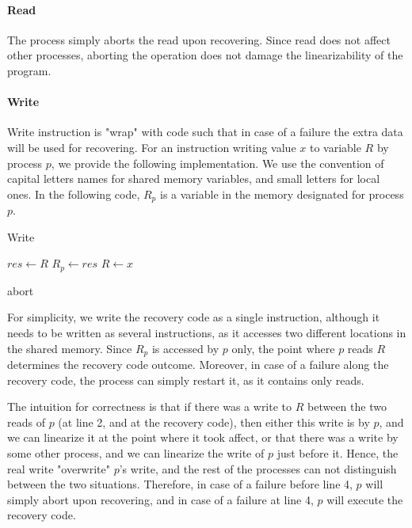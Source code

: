 \paragraph*{Read}

The process simply aborts the read upon recovering. Since read does not affect other processes, aborting the operation does not damage the linearizability of the program.

\paragraph*{Write}
Write instruction is "wrap" with code such that in case of a failure the extra data will be used for recovering. For an instruction writing value $x$ to variable $R$ by process $p$, we provide the following implementation. We use the convention of capital letters names for shared memory variables, and small letters for local ones. In the following code, $R_p$ is a variable in the memory designated for process $p$.

\begin{algorithm}
	\caption{Write}\label{euclid}
	\begin{algorithmic}[1]
		\State $res \gets R$
		\State $R_{p} \gets res$
		\State $R \gets x$
		\EndProcedure
		
		 \Return abort
		\EndIf
		\EndProcedure
	\end{algorithmic}
\end{algorithm}

For simplicity, we write the recovery code as a single instruction, although it needs to be written as several instructions, as it accesses two different locations in the shared memory. Since $R_p$ is accessed by $p$ only, the point where $p$ reads $R$ determines the recovery code outcome. Moreover, in case of a failure along the recovery code, the process can simply restart it, as it contains only reads.

The intuition for correctness is that if there was a write to $R$ between the two reads of $p$ (at line 2, and at the recovery code), then either this write is by $p$, and we can linearize it at the point where it took affect, or that there was a write by some other process, and we can linearize the write of $p$ just before it. Hence, the real write "overwrite" $p$'s write, and the rest of the processes can not distinguish between the two situations. Therefore, in case of a failure before line 4, $p$ will simply abort upon recovering, and in case of a failure at line 4, $p$ will execute the recovery code.

